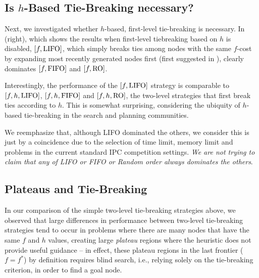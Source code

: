 \subsection{Is $h$-Based Tie-Breaking necessary?}

Next, we investigated whether $h$-based, first-level tie-breaking is necessary.
In  (right), which shows the results when  first-level
tiebreaking based on $h$ is disabled, $[f, \mbox{LIFO}]$, which simply breaks ties among nodes with the same $f$-cost by expanding most recently generated nodes first (first suggested in \cite{korf1985depth}),
clearly dominates $[f, \mbox{FIFO}]$ and $[f, \mbox{RO}]$.

Interestingly, the performance of the $[f, \mbox{LIFO}]$ strategy
is comparable to $[f,h,\mbox{LIFO}]$, $[f,h,\mbox{FIFO}]$ and $[f,h,\mbox{RO}]$, the two-level strategies that first break ties according to $h$.
This is somewhat surprising, considering the ubiquity of $h$-based tie-breaking in the search and planning communities.

We reemphasize that, although LIFO dominated the others, we consider
this is just by a coincidence due to the selection of time limit, memory
limit and problems in the current standard IPC competition
settings. \emph{We are not trying to claim that any of LIFO or FIFO or
Random order always dominates the others}.


\subsection{Plateaus and Tie-Breaking}

In our comparison of the simple two-level tie-breaking strategies
above, we observed that large differences in performance between
two-level tie-breaking strategies tend to occur in problems where
there are many nodes that have the same $f$ and $h$ values, creating
large \emph{plateau} regions where the heuristic does not provide
useful guidance -- in effect, these plateau regions in the last
frontier ($f=f^*$) by definition requires blind search, i.e., 
relying solely on the tie-breaking criterion, in order to
find a goal node.

